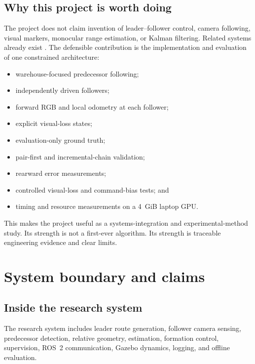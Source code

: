 \documentclass[11pt,oneside,openany]{book}
\begin{document}
\section{Why this project is worth doing}

The project does not claim invention of leader--follower control, camera following, visual markers, monocular range estimation, or Kalman filtering. Related systems already exist \cite{platoon2017,ibvs2020,fisheye2023,range2024,marker2025,platooning2025}. The defensible contribution is the implementation and evaluation of one constrained architecture:
\begin{itemize}
  \item warehouse-focused predecessor following;
  \item independently driven followers;
  \item forward RGB and local odometry at each follower;
  \item explicit visual-loss states;
  \item evaluation-only ground truth;
  \item pair-first and incremental-chain validation;
  \item rearward error measurements;
  \item controlled visual-loss and command-bias tests; and
  \item timing and resource measurements on a 4~GiB laptop GPU.
\end{itemize}

This makes the project useful as a systems-integration and experimental-method study. Its strength is not a first-ever algorithm. Its strength is traceable engineering evidence and clear limits.

\chapter{System boundary and claims}

\section{Inside the research system}

The research system includes leader route generation, follower camera sensing, predecessor detection, relative geometry, estimation, formation control, supervision, ROS~2 communication, Gazebo dynamics, logging, and offline evaluation.
\end{document}
